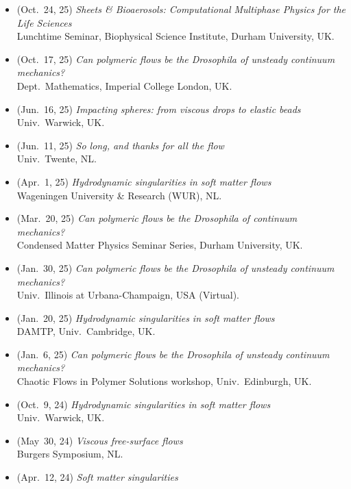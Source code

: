 \begin{itemize}[leftmargin=1.5em]
\item[\textbullet] (Oct.~24, 25) \emph{Sheets \& Bioaerosols: Computational Multiphase Physics for the Life Sciences} \\
  Lunchtime Seminar, Biophysical Science Institute, Durham University, UK.
\item[\textbullet] (Oct.~17, 25) \emph{Can polymeric flows be the Drosophila of unsteady continuum mechanics?} \\
  Dept.~Mathematics, Imperial College London, UK.
\item[\textbullet] (Jun.~16, 25) \emph{Impacting spheres: from viscous drops to elastic beads} \\
  Univ.~Warwick, UK.
\item[\textbullet] (Jun.~11, 25) \emph{So long, and thanks for all the flow} \\
  Univ.~Twente, NL.
\item[\textbullet] (Apr.~1, 25) \emph{Hydrodynamic singularities in soft matter flows} \\
  Wageningen University \& Research (WUR), NL.
\item[\textbullet] (Mar.~20, 25) \emph{Can polymeric flows be the Drosophila of continuum mechanics?} \\
  Condensed Matter Physics Seminar Series, Durham University, UK.
\item[\textbullet] (Jan.~30, 25) \emph{Can polymeric flows be the Drosophila of unsteady continuum mechanics?} \\
  Univ.~Illinois at Urbana-Champaign, USA (Virtual).
\item[\textbullet] (Jan.~20, 25) \emph{Hydrodynamic singularities in soft matter flows} \\
  DAMTP, Univ.~Cambridge, UK.
\item[\textbullet] (Jan.~6, 25) \emph{Can polymeric flows be the Drosophila of unsteady continuum mechanics?} \\
  Chaotic Flows in Polymer Solutions workshop, Univ.~Edinburgh, UK.
\item[\textbullet] (Oct.~9, 24) \emph{Hydrodynamic singularities in soft matter flows} \\
  Univ.~Warwick, UK.
\item[\textbullet] (May~30, 24) \emph{Viscous free-surface flows} \\
  Burgers Symposium, NL.
\item[\textbullet] (Apr.~12, 24) \emph{Soft matter singularities} \\

\end{itemize}
